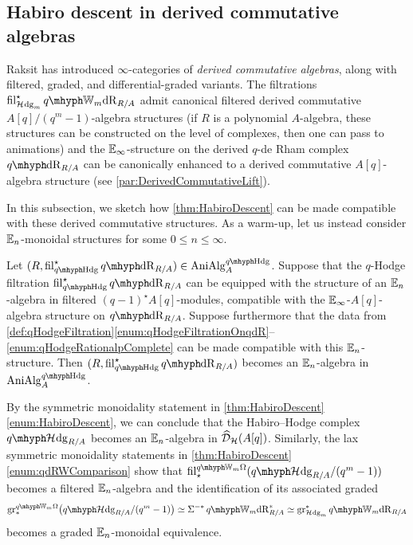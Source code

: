 \documentclass[DIV=12,numbers=enddot,leqno,bibliography=totoc]{scrartcl}
\begin{document}
	
	\subsection{Habiro descent in derived commutative algebras}
	Raksit \cite{RaksitFilteredCircle} has introduced $\infty$-categories of \emph{derived commutative algebras}, along with filtered, graded, and differential-graded variants. The filtrations $ \fil_{\Hhodge_m}^\star \qIW_m\deRham_{R/A}$ admit canonical filtered derived commutative $A[q]/(q^m-1)$-algebra structures (if $R$ is a polynomial $A$-algebra, these structures can be constructed on the level of complexes, then one can pass to animations) and the $\mathbb{E}_\infty$-structure on the derived $q$-de Rham complex $\qdeRham_{R/A}$ can be canonically enhanced to a derived commutative $A[q]$-algebra structure (see \cref{par:DerivedCommutativeLift}).
	
	In this subsection, we sketch how \cref{thm:HabiroDescent} can be made compatible with these derived commutative structures. As a warm-up, let us instead consider $\mathbb{E}_n$-monoidal structures for some $0\leqslant n\leqslant \infty$.
	\begin{numpar}\label{par:EnMonoidalUpgrade}
		Let $(R, \fil_{\qHodge}^\star \qdeRham_{R/A})\in \cat{AniAlg}_A^{\qHodge}$. Suppose that the $q$-Hodge filtration $ \fil_{\qHodge}^\star \qdeRham_{R/A}$ can be equipped with the structure of an $\mathbb{E}_n$-algebra in filtered $(q-1)^\star A[q]$-modules, compatible with the $\mathbb{E}_\infty$-$A[q]$-algebra structure on $\qdeRham_{R/A}$. Suppose furthermore that the data from \cref{def:qHodgeFiltration}\cref{enum:qHodgeFiltrationOnqdR}--\cref{enum:qHodgeRationalpComplete} can be made compatible with this $\mathbb{E}_n$-structure. Then $(R, \fil_{\qHodge}^\star \qdeRham_{R/A})$ becomes an $\mathbb{E}_n$-algebra in $\cat{AniAlg}_A^{\qHodge}$.
		
		By the symmetric monoidality statement in \cref{thm:HabiroDescent}\cref{enum:HabiroDescent}, we can conclude that the Habiro--Hodge complex $\qHhodge_{R/A}$ becomes an $\mathbb{E}_n$-algebra in $\widehat{\mathcal{D}}_{\mathcal{H}}(A[q])$. Similarly, the lax symmetric monoidality statements in \cref{thm:HabiroDescent}\cref{enum:qdRWComparison} show that $ \fil_\star ^{\qIW_m\Omega}(\qHhodge_{R/A}/(q^m-1))$ becomes a filtered $\mathbb{E}_n$-algebra and the identification of its associated graded
		\begin{equation*}
			\gr_*^{\qIW_m\Omega}\bigl(\qHhodge_{R/A}/(q^m-1)\bigr)\simeq \Sigma^{-*}\qIW_m\deRham_{R/A}^*\simeq \gr_{\Hhodge_m}^*\qIW_m\deRham_{R/A}
		\end{equation*}
		becomes a graded $\mathbb{E}_n$-monoidal equivalence.
	\end{numpar}
	
\end{document}
